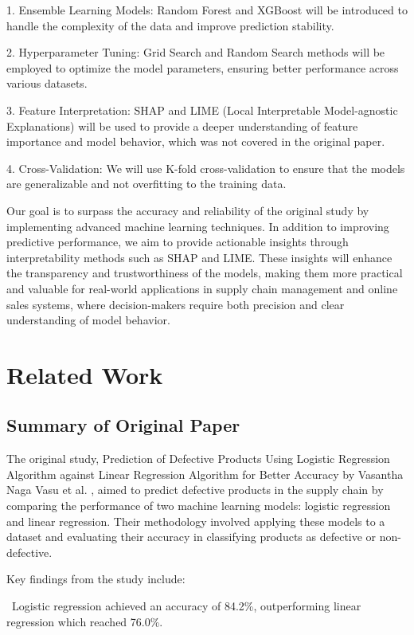 \documentclass[conference]{IEEEtran}
\begin{document}
1. Ensemble Learning Models: Random Forest and XGBoost will be introduced to handle the complexity of the data and improve prediction stability.

2. Hyperparameter Tuning: Grid Search and Random Search methods will be employed to optimize the model parameters, ensuring better performance across various datasets.

3. Feature Interpretation: SHAP and LIME (Local Interpretable Model-agnostic Explanations) will be used to provide a deeper understanding of feature importance and model behavior, which was not covered in the original paper.

4. Cross-Validation: We will use K-fold cross-validation to ensure that the models are generalizable and not overfitting to the training data.

Our goal is to surpass the accuracy and reliability of the original study by implementing advanced machine learning techniques. In addition to improving predictive performance, we aim to provide actionable insights through interpretability methods such as SHAP and LIME. These insights will enhance the transparency and trustworthiness of the models, making them more practical and valuable for real-world applications in supply chain management and online sales systems, where decision-makers require both precision and clear understanding of model behavior.

\section{Related Work}
\subsection{Summary of Original Paper}

The original study, Prediction of Defective Products Using Logistic Regression Algorithm against Linear Regression Algorithm for Better Accuracy by Vasantha Naga Vasu et al. \cite{vasu2022prediction}, aimed to predict defective products in the supply chain by comparing the performance of two machine learning models: logistic regression and linear regression. Their methodology involved applying these models to a dataset and evaluating their accuracy in classifying products as defective or non-defective.

Key findings from the study include:

\noindent \textbullet\ Logistic regression achieved an accuracy of 84.2\%, outperforming linear regression which reached 76.0\%. 
\end{document}
